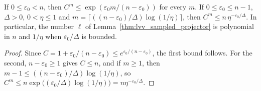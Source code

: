 \begin{lemma}
    \label{lem:lvv_power_normalization_size}
    \leanok
    If $0\le\varepsilon_0<n$, then
    $C^m\le\exp(\varepsilon_0m/(n-\varepsilon_0))$ for every $m$. If
    $0\le\varepsilon_0\le n-1$, $\Delta>0$, $0<\eta\le1$ and
    $m=\lceil((n-\varepsilon_0)/\Delta)\log(1/\eta)\rceil$, then
    $C^m\le n\,\eta^{-\varepsilon_0/\Delta}$. In particular, the number $\ell$
    of Lemma~\ref{thm:lvv_sampled_projector} is polynomial in $n$ and
    $1/\eta$ when $\varepsilon_0/\Delta$ is bounded.
\end{lemma}

\begin{proof}
    \leanok
    Since $C=1+\varepsilon_0/(n-\varepsilon_0)\le e^{\varepsilon_0/(n-\varepsilon_0)}$,
    the first bound follows. For the second, $n-\varepsilon_0\ge1$ gives
    $C\le n$, and if $m\ge1$, then $m-1\le((n-\varepsilon_0)/\Delta)\log(1/\eta)$,
    so $C^m\le n\exp\bigl((\varepsilon_0/\Delta)\log(1/\eta)\bigr)
        =n\eta^{-\varepsilon_0/\Delta}$.
\end{proof}
